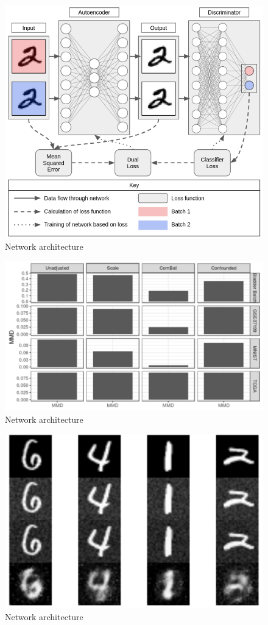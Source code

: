 \documentclass[notitlepage]{article}
\begin{document}
\begin{figure}
	\centering
	\includegraphics[width=4.5in]{figures/rough/network}
	\caption{Network architecture}
	\label{simulationfigure}
\end{figure}
\begin{figure}
	\centering
	\includegraphics[width=4.5in]{figures/rough/mmd}
	\caption{Network architecture}
	\label{simulationfigure}
\end{figure}
\begin{figure}
	\centering
	\includegraphics[width=4.5in]{figures/rough/mnist}
	\caption{Network architecture}
	\label{simulationfigure}
\end{figure}
\end{document}

